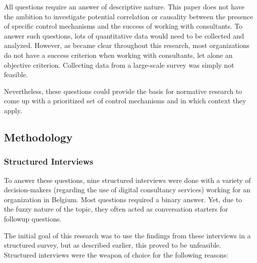 \documentclass[12pt]{article}
\begin{document}
All questions require an answer of descriptive nature. This paper does
not have the ambition to investigate potential correlation or causality
between the presence of specific control mechanisms and the success of
working with consultants. To answer such questions, lots of quantitative
data would need to be collected and analyzed. However, as became clear
throughout this research, most organizations do not have a success
criterion when working with consultants, let alone an objective
criterion. Collecting data from a large-scale survey was simply not
feasible.

Nevertheless, these questions could provide the basis for normative
research to come up with a prioritized set of control mechanisms and in
which context they apply.

\subsection{Methodology}\label{methodology}

\subsubsection{Structured Interviews}\label{structured-interviews}

To answer these questions, nine structured interviews were done with a
variety of decision-makers (regarding the use of digital consultancy
services) working for an organization in Belgium. Most questions
required a binary answer. Yet, due to the fuzzy nature of the topic,
they often acted as conversation starters for followup questions.

The initial goal of this research was to use the findings from these
interviews in a structured survey, but as described earlier, this proved
to be unfeasible. Structured interviews were the weapon of choice for
the following reasons:
\end{document}
